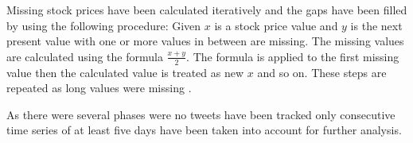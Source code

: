 \begin{description}
    Missing stock prices have been calculated iteratively and the gaps have been filled by using the following procedure:
    Given $x$ is a stock price value and $y$ is the next present value with one or more values in between are missing.
    The missing values are calculated using the formula $\frac{x+y}{2}$.
    The formula is applied to the first missing value then the calculated value is treated as new $x$ and so on.
    These steps are repeated as long values were missing
    \cite{Pagolu2016a}.

    As there were several phases were no tweets have been tracked only consecutive time series of at least five days have been taken into account for further analysis.

\end{description}
